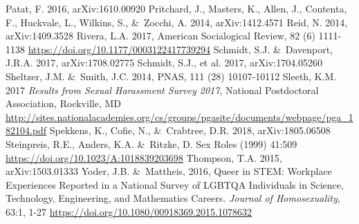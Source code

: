 \documentclass[modern]{aastex62}
\begin{document}
\begin{thebibliography}{}
 Patat, F. 2016, arXiv:1610.00920
 Pritchard, J., Masters, K., Allen, J., Contenta, F., Huckvale, L., Wilkins, S., \&\ Zocchi, A. 2014, arXiv:1412.4571
 Reid, N. 2014, arXiv:1409.3528
 Rivera, L.A. 2017, American Socialogical Review, 82 (6) 1111-1138 \url{https://doi.org/10.1177/0003122417739294}
 Schmidt, S.J. \&\ Davenport, J.R.A. 2017, arXiv:1708.02775
 Schmidt, S.J., et al. 2017, arXiv:1704.05260
 Sheltzer, J.M. \&\ Smith, J.C. 2014, PNAS, 111 (28) 10107-10112
 Sleeth, K.M. 2017 {\it Results from Sexual Harassment Survey 2017}, National Postdoctoral Association, Rockville, MD \url{http://sites.nationalacademies.org/cs/groups/pgasite/documents/webpage/pga_182104.pdf}
 Spekkens, K., Cofie, N., \&\ Crabtree, D.R. 2018, arXiv:1805.06508
 Steinpreis, R.E., Anders, K.A. \&\ Ritzke, D. Sex Roles (1999) 41:509 \url{https://doi.org/10.1023/A:1018839203698}
 Thompson, T.A. 2015, arXiv:1503.01333
 Yoder, J.B. \&\ Mattheis, 2016, Queer in STEM: Workplace Experiences Reported in a National Survey of LGBTQA Individuals in Science, Technology, Engineering, and Mathematics Careers. {\it Journal of Homosexuality}, 63:1, 1-27 \url{https://doi.org/10.1080/00918369.2015.1078632}
\end{thebibliography}
\end{document}
